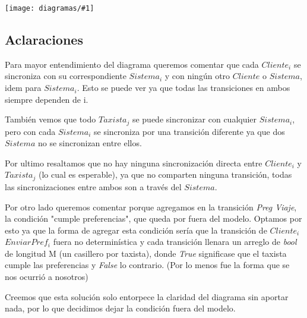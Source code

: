 \documentclass[a4paper, 10pt, twoside]{article}
\newcommand{\diagramav}[1]{%
  \texttt{[image: diagramas/\#1]}%
}
\begin{document}
\diagramav{fsm-taxi}

\subsection{Aclaraciones}

Para mayor entendimiento del diagrama queremos comentar que cada $Cliente_i$ se sincroniza con su correspondiente $Sistema_i$ y con ning\'un otro $Cliente$ o $Sistema$, idem para $Sistema_i$. Esto se puede ver ya que todas las transiciones en ambos siempre dependen de i.

Tambi\'en vemos que todo $Taxista_j$ se puede sincronizar con cualquier $Sistema_i$, pero con cada $Sistema_i$ se sincroniza por una transici\'on diferente ya que dos $Sistema$ no se sincronizan entre ellos.

Por ultimo resaltamos que no hay ninguna sincronizaci\'on directa entre $Cliente_i$ y $Taxista_j$ (lo cual es esperable), ya que no comparten ninguna transici\'on, todas las sincronizaciones entre ambos son a través del $Sistema$.

Por otro lado queremos comentar porque agregamos en la transici\'on \emph{Preg Viaje}, la condici\'on "cumple preferencias", que queda por fuera del modelo. Optamos por esto ya que la forma de agregar esta condici\'on ser\'ia que la transici\'on de $Cliente_i$ $EnviarPref_i$ fuera no determin\'istica y cada transici\'on llenara un arreglo de \emph{bool} de longitud M (un casillero por taxista), donde \emph{True} significase que el taxista cumple las preferencias y \emph{False} lo contrario. (Por lo menos fue la forma que se nos ocurri\'o a nosotros) %

Creemos que esta soluci\'on solo entorpece la claridad del diagrama sin aportar nada, por lo que decidimos dejar la condici\'on fuera del modelo.






\end{document}
